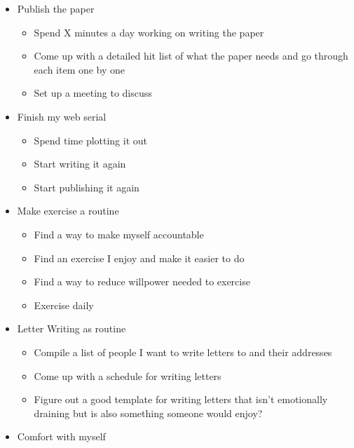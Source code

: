 \documentclass[12pt]{article}[titlepage]
\renewcommand{\,}{\textsuperscript{,}}
\begin{document}
\begin{itemize}
\begin{itemize}
\item Spend time with people.\footnote{I'm not putting any further details here, because I um don't want to incriminate myself further/make it something problematic (not that I have any ill intentions, just writing something semi publicly makes anything seem more nefarious}  
\item Find a place to volunteer and start doing so regularly  
\end{itemize}  
\item Publish the paper  
\begin{itemize}  
\item Spend X minutes a day working on writing the paper  
\item Come up with a detailed hit list of what the paper needs and go through each item one by one  
\item Set up a meeting to discuss  
\end{itemize}  
\item Finish my web serial  
\begin{itemize}  
\item Spend time plotting it out  
\item Start writing it again  
\item Start publishing it again  
\end{itemize}  
\item Make exercise a routine  
\begin{itemize}  
\item Find a way to make myself accountable  
\item Find an exercise I enjoy and make it easier to do  
\item Find a way to reduce willpower needed to exercise  
\item Exercise daily  
\end{itemize}  
\item Letter Writing as routine  
\begin{itemize}  
\item Compile a list of people I want to write letters to and their addresses  
\item Come up with a schedule for writing letters  
\item Figure out a good template for writing letters that isn't emotionally draining but is also something someone would enjoy?  
\end{itemize}  
\item Comfort with myself  
\begin{itemize}  

\end{itemize}
\end{itemize}
\end{document}
